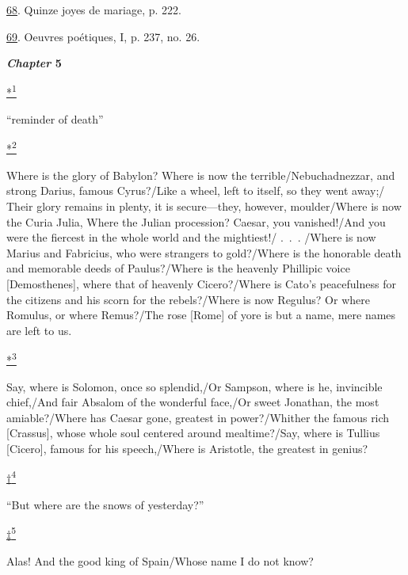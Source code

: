 \protect\hypertarget{23_NOTES.xhtmlux5cux23id_1354}{\protect\hyperlink{11_Chapter_Four__THE_FORMS_OF_LOVE.xhtmlux5cux23id_1353}{68}}.
Quinze joyes de mariage, p. 222.

\protect\hypertarget{23_NOTES.xhtmlux5cux23id_1352}{\protect\hyperlink{11_Chapter_Four__THE_FORMS_OF_LOVE.xhtmlux5cux23id_1351}{69}}.
Oeuvres poétiques, I, p. 237, no. 26.

\textbf{\emph{Chapter} 5}

\protect\hypertarget{23_NOTES.xhtmlux5cux23id_2951}{\protect\hyperlink{12_Chapter_Five__THE_VISION_OF_DEAT.xhtmlux5cux23id_2952}{*\textsuperscript{1}}}
``reminder of death''

\protect\hypertarget{23_NOTES.xhtmlux5cux23id_2956}{\protect\hyperlink{12_Chapter_Five__THE_VISION_OF_DEAT.xhtmlux5cux23id_2955}{*\textsuperscript{2}}}
Where is the glory of Babylon? Where is now the terrible/Nebuchadnezzar,
and strong Darius, famous Cyrus?/Like a wheel, left to itself, so they
went away;/ Their glory remains in plenty, it is secure---they, however,
moulder/Where is now the Curia Julia, Where the Julian procession?
Caesar, you vanished!/And you were the fiercest in the whole world and
the mightiest!/ .~.~. /Where is now Marius and Fabricius, who were
strangers to gold?/Where is the honorable death and memorable deeds of
Paulus?/Where is the heavenly Phillipic voice {[}Demosthenes{]}, where
that of heavenly Cicero?/Where is Cato's peacefulness for the citizens
and his scorn for the rebels?/Where is now Regulus? Or where Romulus, or
where Remus?/The rose {[}Rome{]} of yore is but a name, mere names are
left to us.

\protect\hypertarget{23_NOTES.xhtmlux5cux23id_2954}{\protect\hyperlink{12_Chapter_Five__THE_VISION_OF_DEAT.xhtmlux5cux23id_2953}{*\textsuperscript{3}}}
Say, where is Solomon, once so splendid,/Or Sampson, where is he,
invincible chief,/And fair Absalom of the wonderful face,/Or sweet
Jonathan, the most amiable?/Where has Caesar gone, greatest in
power?/Whither the famous rich {[}Crassus{]}, whose whole soul centered
around mealtime?/Say, where is Tullius {[}Cicero{]}, famous for his
speech,/Where is Aristotle, the greatest in genius?

\protect\hypertarget{23_NOTES.xhtmlux5cux23id_2958}{\protect\hyperlink{12_Chapter_Five__THE_VISION_OF_DEAT.xhtmlux5cux23id_2957}{†\textsuperscript{4}}}
``But where are the snows of yesterday?''

\protect\hypertarget{23_NOTES.xhtmlux5cux23id_2960}{\protect\hyperlink{12_Chapter_Five__THE_VISION_OF_DEAT.xhtmlux5cux23id_2959}{‡\textsuperscript{5}}}
Alas! And the good king of Spain/Whose name I do not know?


